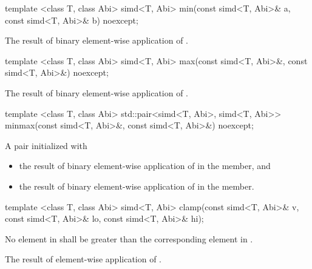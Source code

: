 \begin{itemdecl}
template <class T, class Abi> simd<T, Abi> min(const simd<T, Abi>& a, const simd<T, Abi>& b) noexcept;
\end{itemdecl}
\begin{itemdescr}
  \pnum\returns The result of binary element-wise application of  \foralli.
\end{itemdescr}

\begin{itemdecl}
template <class T, class Abi> simd<T, Abi> max(const simd<T, Abi>&, const simd<T, Abi>&) noexcept;
\end{itemdecl}
\begin{itemdescr}
  \pnum\returns The result of binary element-wise application of  \foralli.
\end{itemdescr}

\begin{itemdecl}
template <class T, class Abi>
std::pair<simd<T, Abi>, simd<T, Abi>> minmax(const simd<T, Abi>&, const simd<T, Abi>&) noexcept;
\end{itemdecl}
\begin{itemdescr}
  \pnum\returns A pair initialized with
  \begin{itemize}
    \item the result of binary element-wise application of  \foralli in the  member, and
    \item the result of binary element-wise application of  \foralli in the  member.
  \end{itemize}
\end{itemdescr}

\begin{itemdecl}
template <class T, class Abi>
simd<T, Abi> clamp(const simd<T, Abi>& v, const simd<T, Abi>& lo, const simd<T, Abi>& hi);
\end{itemdecl}
\begin{itemdescr}
  \pnum\requires No element in  shall be greater than the corresponding element in .

  \pnum\returns The result of element-wise application of  \foralli.
\end{itemdescr}

